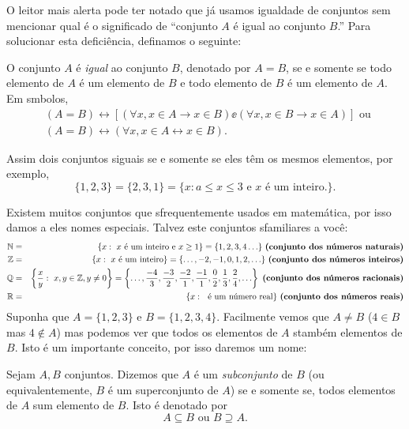 O leitor mais alerta pode ter notado que j\'a usamos igualdade de conjuntos sem mencionar qual \'e o significado de ``conjunto $A$ \'e igual ao conjunto $B$.'' Para solucionar esta defici\^encia, definamos o seguinte:

\begin{definb}
O conjunto $A$ \'e {\it igual} ao conjunto $B$, denotado por $A=B$, se e somente se todo elemento de $A$ \'e um elemento de $B$ e todo elemento de $B$ \'e um elemento de $A$. Em s\ih mbolos,
\begin{eqnarray*}
&(A=B)\leftrightarrow [(\forall x, x\in A \to x\in B)\ee(\forall x, x\in B \to x\in A)] \textrm{ ou } \\
&(A=B)\leftrightarrow (\forall x, x\in A \leftrightarrow x\in B).
\end{eqnarray*}
\end{definb}
 
Assim dois conjuntos s\ao iguais se e somente se eles t\^em os mesmos elementos, por exemplo,
\[
\{1,2,3\}=\{2,3,1\}=\{x:a\leq x\leq 3 \textrm{ e $x$ \'e um inteiro.}\}.
\]

Existem muitos conjuntos que s\ao frequentemente usados em matem\'atica, por isso damos a eles nomes especiais. Talvez este conjuntos s\ao familiares a voc\^e:
\begin{eqnarray*}
\mathbb{N}&=&\{x:\textrm{ } x \textrm{ \'e um inteiro e $x\geq 1$}\}=\{1,2,3,4\ldots\} \textrm{ {\bf (conjunto dos n\'umeros naturais)}}\\
\mathbb{Z}&=&\{x:\textrm{ } x \textrm{ \'e um inteiro}\}=\{\ldots,-2,-1,0,1,2,\ldots\} \textrm{ {\bf (conjunto dos n\'umeros inteiros)}}\\
\mathbb{Q}&=&\left\{\dfrac{x}{y}: \textrm{ } x,y\in\mathbb{Z},y\neq 0\right\}=\left\{\ldots,\dfrac{-4}{3},\dfrac{-3}{2},\dfrac{-2}{1},\dfrac{-1}{1},\dfrac{0}{2},\dfrac{1}{3},\dfrac{2}{4},\ldots\right\} \textrm{ {\bf (conjunto dos n\'umeros racionais)}}\\
\mathbb{R}&=&\{x:\textrm{ } \textrm{ \'e um n\'umero real}\} \textrm{ {\bf (conjunto dos n\'umeros reais)}}
\end{eqnarray*}
Suponha que $A=\{1,2,3\}$ e $B=\{1,2,3,4\}$. Facilmente vemos que $A\neq B$ ($4\in B$ mas $4\notin A$) mas podemos ver que todos os elementos de $A$ s\ao tamb\'em elementos de $B$. Isto \'e um importante conceito, por isso daremos um nome:

\begin{definb}
Sejam $A,B$ conjuntos. Dizemos que $A$ \'e um {\it subconjunto}  de $B$ (ou equivalentemente, $B$ \'e um superconjunto de $A$) se e somente se, todos elementos de $A$ s\ao um elemento de $B$. Isto \'e denotado por
\[
A \subseteq B \textrm{ ou } B \supseteq A. 
\]
\end{definb}

